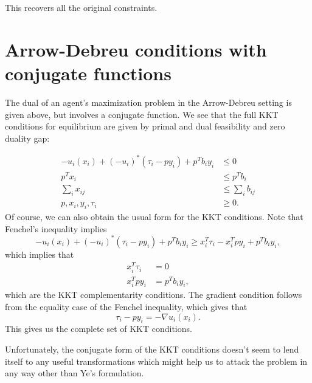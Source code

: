 \documentclass{article}
\begin{document}
This recovers all the original constraints.

\section{Arrow-Debreu conditions with conjugate functions}
The dual of an agent's maximization problem in the Arrow-Debreu setting
is given above, but involves a conjugate function.
We see that the full KKT conditions for equilibrium are given by
primal and dual feasibility and zero duality gap:

\begin{align*}
-u_i(x_i) + (-u_i)^*(\tau_i - p y_i) + p^T b_i y_i &\leq 0\\
p^T x_i &\leq p^T b_i \\
\sum_i x_{ij} &\leq \sum_i b_{ij}\\
p, x_i, y_i, \tau_i &\geq 0.
\end{align*}
Of course, we can also obtain the usual form for the KKT conditions.
Note that Fenchel's inequality implies
\[
-u_i(x_i) + (-u_i)^*(\tau_i - p y_i) + p^T b_i y_i
\geq x_i^T \tau_i - x_i^T p y_i + p^T b_i y_i,
\]
which implies that
\begin{align*}
x_i^T \tau_i &= 0\\
x_i^T p y_i &= p^T b_i y_i,
\end{align*}
which are the KKT complementarity conditions.
The gradient condition follows from the equality case of the Fenchel inequality,
which gives that
\[
\tau_i - p y_i = - \nabla u_i(x_i).
\]
This gives us the complete set of KKT conditions.

Unfortunately, the conjugate form of the KKT conditions doesn't seem to lend
itself to any useful transformations which might help us to attack the problem
in any way other than Ye's formulation.

\newpage


\end{document}
